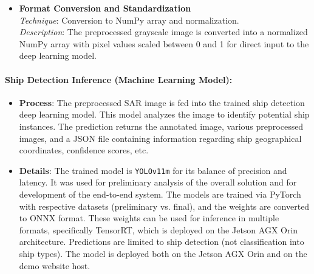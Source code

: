 \documentclass{article}
\begin{document}
\begin{itemize}
\begin{itemize}
\begin{itemize}
			
			\item \textbf{Noise Reduction and Edge Enhancement} \\
			\textit{Technique}: Gamma filtering and alpha-based enhancement. \\
			\textit{Description}: A gamma correction ($\gamma = 0.6$) suppresses dim background noise while retaining ship features, followed by an enhancement filter ($\alpha = \tfrac{10}{7}$) to increase the brightness of ships and suppress residual noise.
			
		\end{itemize}
		
		\item \textbf{Format Conversion and Standardization} \\
		\textit{Technique}: Conversion to NumPy array and normalization. \\
		\textit{Description}: The preprocessed grayscale image is converted into a normalized NumPy array with pixel values scaled between 0 and 1 for direct input to the deep learning model.
	\end{itemize}
\end{itemize}

\paragraph{Ship Detection Inference (Machine Learning Model):}
\begin{itemize}
	\item \textbf{Process}: The preprocessed SAR image is fed into the trained ship detection deep learning model. This model analyzes the image to identify potential ship instances. The prediction returns the annotated image, various preprocessed images, and a JSON file containing information regarding ship geographical coordinates, confidence scores, etc.
	
	\item \textbf{Details}: The trained model is \texttt{YOLOv11m} for its balance of precision and latency. It was used for preliminary analysis of the overall solution and for development of the end-to-end system. The models are trained via PyTorch with respective datasets (preliminary vs. final), and the weights are converted to ONNX format. These weights can be used for inference in multiple formats, specifically TensorRT, which is deployed on the Jetson AGX Orin architecture. Predictions are limited to ship detection (not classification into ship types). The model is deployed both on the Jetson AGX Orin and on the demo website host.
\end{itemize}
\end{document}
